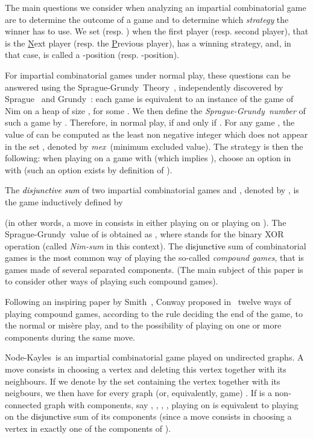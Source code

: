\documentclass[11pt]{article}
\newcommand{\modif}[1]{\textcolor{black}{#1}}
\newcommand{\NK}{Node-Kayles}
\newcommand{\SP}{Sprague-Grundy}
\begin{document}
The main questions we consider when analyzing an impartial combinatorial game are 
to determine the outcome  of a game  and  to determine which {\em strategy}
the winner has to use. 
We set  (resp. ) when the first player (resp. second player), that is
the \underline{N}ext player (resp. the \underline{P}revious player), has a
winning strategy, and, in that case,  is called a -position
(resp. -position).

For impartial combinatorial games under normal play, these questions 
can be answered using the \SP\ Theory~\cite{WW,ONAG}, independently discovered by 
Sprague~\cite{SPRAGUE-36} and Grundy~\cite{GRUNDY-39}: 
each game  is equivalent to an instance of the game of Nim
on a heap of size , for some . We then define the 
{\em \SP\ number}  of such a game  by .
Therefore, in normal play,  if and only if .
For any game , the value of  can be computed as the least
non negative integer which does not appear in the set
, denoted by 
{\it mex\,} (minimum excluded value).
The strategy is then the following: when playing on a game  with
 (which implies ), choose an option  in
 with  (such an option exists by definition of ).

The \modif{{\em disjunctive sum}} of two impartial combinatorial games  and
, denoted by , is the game inductively defined by
  
(in other words, a move in  consists in either playing on 
or playing on ).
The \SP\ value of  is obtained as 
, where  stands
for the binary XOR operation (called {\em Nim-sum} in this context).
The \modif{disjunctive} sum of combinatorial games
is the most common way of playing the so-called {\em compound games},
that is games made of several separated components. (The main subject
of this paper is to consider other ways of playing such compound games).

Following an inspiring paper by Smith~\cite{SMITH-66},
Conway proposed in~\cite[Chapter~14]{ONAG} twelve ways of playing compound games,
according to the rule deciding the end of the game, to the normal or
mis\`ere play, and to the possibility of playing on one or more components
during the same move.

\NK\ is an impartial combinatorial game played on
undirected graphs. A move consists 
in choosing a vertex and deleting this vertex
together with its neighbours. 
If we denote by  the set containing the vertex  together with
its neigbours, we then have 
for every graph (or, equivalently, game) . 
If  is a non-connected graph with  components, say , , , ,
playing on  is equivalent to playing on the \modif{disjunctive} sum
 of its components (since a move consists in choosing
a vertex in exactly one of the components of ).
\end{document}
